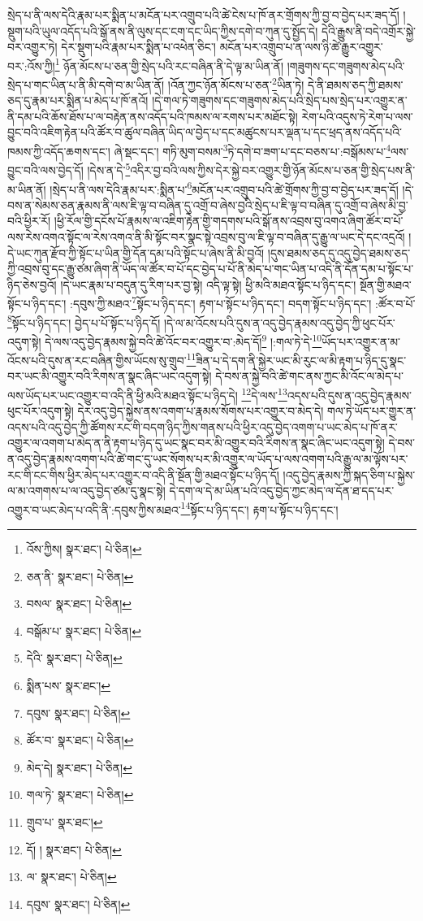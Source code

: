 སྲེད་པ་ནི་ལས་དེའི་རྣམ་པར་སྨིན་པ་མངོན་པར་འགྲུབ་པའི་ཚེ་ངེས་པ་ཁོ་ནར་གྲོགས་ཀྱི་བྱ་བ་བྱེད་པར་ཟད་དོ། །སྡུག་པའི་ཡུལ་འདོད་པའི་སྒོ་ནས་ནི་ལུས་དང་ངག་དང་ཡིད་ཀྱིས་དགེ་བ་ཀུན་དུ་སྤྱོད་དེ། དེའི་རྒྱུས་ནི་བདེ་འགྲོར་སྐྱེ་བར་འགྱུར་ཏེ། དེར་སྡུག་པའི་རྣམ་པར་སྨིན་པ་འཕེན་ཅིང་། མངོན་པར་འགྲུབ་པ་ན་ལས་ཉི་ཚེ་རྒྱུར་འགྱུར་བར་:འོས་ཀྱི།\footnote{འོས་ཀྱིས།  སྣར་ཐང་།  པེ་ཅིན། } ཉོན་མོངས་པ་ཅན་གྱི་སྲེད་པའི་རང་བཞིན་ནི་དེ་ལྟ་མ་ཡིན་ནོ། །གཟུགས་དང་གཟུགས་མེད་པའི་སྲེད་པ་གང་ཡིན་པ་ནི་མི་དགེ་བ་མ་ཡིན་ནོ། །འོན་ཀྱང་ཉོན་མོངས་པ་ཅན་\footnote{ཅན་ནི་  སྣར་ཐང་།  པེ་ཅིན། }ཡིན་ཏེ། དེ་ནི་ཐམས་ཅད་ཀྱི་ཐམས་ཅད་དུ་རྣམ་པར་སྨིན་པ་མེད་པ་ཁོ་ནའོ། །དེ་གལ་ཏེ་གཟུགས་དང་གཟུགས་མེད་པའི་སྲེད་པས་སྲེད་པར་འགྱུར་ན་ནི་དམ་པའི་ཆོས་ཐོས་པ་ལ་བརྟེན་ནས་འདོད་པའི་ཁམས་ལ་རགས་པར་མཐོང་སྟེ། རེག་པའི་འདུས་ཏེ་རེག་པ་ལས་བྱུང་བའི་འཇིག་རྟེན་པའི་ཚོར་བ་ཚུལ་བཞིན་ཡིད་ལ་བྱེད་པ་དང་མཚུངས་པར་ལྡན་པ་དང་ཕྲད་ནས་འདོད་པའི་ཁམས་ཀྱི་འདོད་ཆགས་དང་། ཞེ་སྡང་དང་། གཏི་མུག་བསམ་\footnote{བསལ་  སྣར་ཐང་།  པེ་ཅིན། }ཏེ་དགེ་བ་ཟག་པ་དང་བཅས་པ་:བསྒོམས་པ་\footnote{བསྒོམ་པ་  སྣར་ཐང་།  པེ་ཅིན། }ལས་བྱུང་བའི་ལས་བྱེད་དོ། །དེས་ན་དེ་\footnote{དེའི་  སྣར་ཐང་།  པེ་ཅིན། }འདིར་བྱ་བའི་ལས་ཀྱིས་དེར་སྐྱེ་བར་འགྱུར་གྱི་ཉོན་མོངས་པ་ཅན་གྱི་སྲེད་པས་ནི་མ་ཡིན་ནོ། །སྲེད་པ་ནི་ལས་དེའི་རྣམ་པར་:སྨིན་པ་\footnote{སྨིན་པས་  སྣར་ཐང་། }མངོན་པར་འགྲུབ་པའི་ཚེ་གྲོགས་ཀྱི་བྱ་བ་བྱེད་པར་ཟད་དོ། །དེ་བས་ན་སེམས་ཅན་རྣམས་ནི་ལས་ཇི་ལྟ་བ་བཞིན་དུ་འགྲོ་བ་ཞེས་བྱའི་སྲེད་པ་ཇི་ལྟ་བ་བཞིན་དུ་འགྲོ་བ་ཞེས་མི་བྱ་བའི་ཕྱིར་རོ། །ཕྱི་རོལ་གྱི་དངོས་པོ་རྣམས་ལ་འཇིག་རྟེན་གྱི་གདགས་པའི་སྒོ་ནས་འབྲས་བུ་འགའ་ཞིག་ཚོར་བ་པོ་ལས་རེས་འགའ་སྟོང་ལ་རེས་འགའ་ནི་མི་སྟོང་བར་སྣང་སྟེ་འབྲས་བུ་ལ་ཇི་ལྟ་བ་བཞིན་དུ་རྒྱུ་ལ་ཡང་དེ་དང་འདྲའོ། །དེ་ཡང་ཀུན་རྫོབ་ཀྱི་སྟོང་པ་ཡིན་གྱི་དོན་དམ་པའི་སྟོང་པ་ཞེས་ནི་མི་བྱའོ། །དུས་ཐམས་ཅད་དུ་འདུ་བྱེད་ཐམས་ཅད་ཀྱི་འབྲས་བུ་དང་རྒྱུ་ཙམ་ཞིག་ནི་ཡོད་ལ་ཚོར་བ་པོ་དང་བྱེད་པ་པོ་ནི་མེད་པ་གང་ཡིན་པ་འདི་ནི་དོན་དམ་པ་སྟོང་པ་ཉིད་ཅེས་བྱའོ། །དེ་ཡང་རྣམ་པ་བདུན་དུ་རིག་པར་བྱ་སྟེ། འདི་ལྟ་སྟེ། ཕྱི་མའི་མཐའ་སྟོང་པ་ཉིད་དང་། སྔོན་གྱི་མཐའ་སྟོང་པ་ཉིད་དང་། :དབུས་ཀྱི་མཐའ་\footnote{དབུས་  སྣར་ཐང་།  པེ་ཅིན། }སྟོང་པ་ཉིད་དང་། རྟག་པ་སྟོང་པ་ཉིད་དང་། བདག་སྟོང་པ་ཉིད་དང་། :ཚོར་བ་པོ་\footnote{ཚོར་བ་  སྣར་ཐང་།  པེ་ཅིན། }སྟོང་པ་ཉིད་དང་། བྱེད་པ་པོ་སྟོང་པ་ཉིད་དོ། །དེ་ལ་མ་འོངས་པའི་དུས་ན་འདུ་བྱེད་རྣམས་འདུ་བྱེད་ཀྱི་ཕུང་པོར་འདུག་སྟེ། དེ་ལས་འདུ་བྱེད་རྣམས་སྐྱེ་བའི་ཚེ་འོང་བར་འགྱུར་བ་:མེད་དོ།\footnote{མེད་དེ།  སྣར་ཐང་།  པེ་ཅིན། } །:གལ་ཏེ་དེ་\footnote{གལ་ཏེ་  སྣར་ཐང་།  པེ་ཅིན། }ཡོད་པར་འགྱུར་ན་མ་འོངས་པའི་དུས་ན་རང་བཞིན་གྱིས་ཡོངས་སུ་གྲུབ་\footnote{གྲུབ་པ་  སྣར་ཐང་། }ཟིན་པ་དེ་དག་ནི་སྐྱེར་ཡང་མི་རུང་ལ་མི་རྟག་པ་ཉིད་དུ་སྣང་བར་ཡང་མི་འགྱུར་བའི་རིགས་ན་སྣང་ཞིང་ཡང་འདུག་སྟེ། དེ་བས་ན་སྐྱེ་བའི་ཚེ་གང་ནས་ཀྱང་མི་འོང་ལ་མེད་པ་ལས་ཡོད་པར་ཡང་འགྱུར་བ་འདི་ནི་ཕྱི་མའི་མཐའ་སྟོང་པ་ཉིད་དེ། \footnote{དོ། །  སྣར་ཐང་།  པེ་ཅིན། }དེ་ལས་\footnote{ལ་  སྣར་ཐང་།  པེ་ཅིན། }འདས་པའི་དུས་ན་འདུ་བྱེད་རྣམས་ཕུང་པོར་འདུག་སྟེ། དེར་འདུ་བྱེད་སྐྱེས་ནས་འགག་པ་རྣམས་སོགས་པར་འགྱུར་བ་མེད་དེ། གལ་ཏེ་ཡོད་པར་གྱུར་ན་འདས་པའི་འདུ་བྱེད་ཀྱི་ཚོགས་རང་གི་བདག་ཉིད་ཀྱིས་གནས་པའི་ཕྱིར་འདུ་བྱེད་འགག་པ་ཡང་མེད་པ་ཁོ་ནར་འགྱུར་ལ་འགག་པ་མེད་ན་ནི་རྟག་པ་ཉིད་དུ་ཡང་སྣང་བར་མི་འགྱུར་བའི་རིགས་ན་སྣང་ཞིང་ཡང་འདུག་སྟེ། དེ་བས་ན་འདུ་བྱེད་རྣམས་འགག་པའི་ཚེ་གང་དུ་ཡང་སོགས་པར་མི་འགྱུར་ལ་ཡོད་པ་ལས་འགག་པའི་རྒྱུ་ལ་མ་ལྟོས་པར་རང་གི་ངང་གིས་ཕྱིར་མེད་པར་འགྱུར་བ་འདི་ནི་སྔོན་གྱི་མཐའ་སྟོང་པ་ཉིད་དོ། །འདུ་བྱེད་རྣམས་ཀྱི་སྐད་ཅིག་པ་སྐྱེས་ལ་མ་འགགས་པ་ལ་འདུ་བྱེད་ཙམ་དུ་སྣང་སྟེ། དེ་དག་ལ་དེ་མ་ཡིན་པའི་འདུ་བྱེད་ཀྱང་མེད་ལ་དོན་ཐ་དད་པར་འགྱུར་བ་ཡང་མེད་པ་འདི་ནི་:དབུས་ཀྱིས་མཐའ་\footnote{དབུས་  སྣར་ཐང་།  པེ་ཅིན། }སྟོང་པ་ཉིད་དང་། རྟག་པ་སྟོང་པ་ཉིད་དང་། 